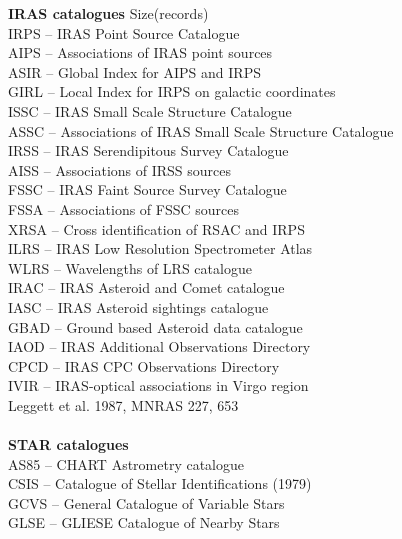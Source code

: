 \begin{tabbing}
{\bf \Large IRAS catalogues}
\> \> \> \> Size(records)\\
\>IRPS \>-- \>IRAS Point Source Catalogue\\
\>AIPS \>-- \>Associations of IRAS point sources\\
\>ASIR \>-- \>Global Index for AIPS and IRPS\\
\>GIRL \>-- \>Local Index for IRPS on galactic coordinates\\
\>ISSC \>-- \>IRAS Small Scale Structure Catalogue\\
\>ASSC \>-- \>Associations of IRAS Small Scale Structure Catalogue\\
\>IRSS \>-- \>IRAS Serendipitous Survey Catalogue\\
\>AISS \>-- \>Associations of IRSS sources\\
\>FSSC \>-- \>IRAS Faint Source Survey Catalogue\\
\>FSSA \>-- \>Associations of FSSC sources\\
\>XRSA \>-- \>Cross identification of RSAC and IRPS\> \\
\>ILRS \>-- \>IRAS Low Resolution Spectrometer Atlas\\
\>WLRS \>-- \>Wavelengths of LRS catalogue\\
\>IRAC \>-- \>IRAS Asteroid and Comet catalogue\\
\>IASC \>-- \>IRAS Asteroid sightings catalogue\\
\>GBAD \>-- \>Ground based Asteroid data catalogue\\
\>IAOD \>-- \>IRAS Additional Observations Directory\\
\>CPCD \>-- \>IRAS CPC Observations Directory\\
\>IVIR \>-- \>IRAS-optical associations in Virgo region\\
\>     \>   \>Leggett et al. 1987, MNRAS 227, 653\\
\\
{\bf \Large \hspace{-0.4in}
STAR catalogues}\\
\>AS85 \>-- \>CHART Astrometry catalogue\\
\>CSIS \>-- \>Catalogue of Stellar Identifications (1979)\\
\>GCVS \>-- \>General Catalogue of Variable Stars\\
\>GLSE \>-- \>GLIESE Catalogue of Nearby Stars\\

\end{tabbing}
